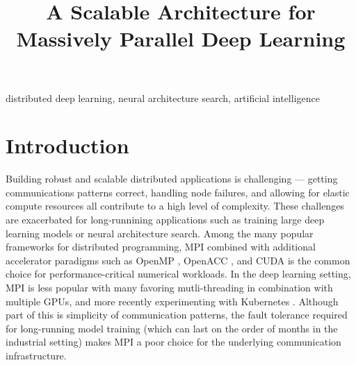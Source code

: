 \documentclass[conference]{IEEEtran}
\begin{document}
\title{A Scalable Architecture for Massively Parallel Deep Learning}

\author{
\and
{}
}

\maketitle

\begin{abstract}

\end{abstract}

\begin{IEEEkeywords}
distributed deep learning, neural architecture search, artificial intelligence
\end{IEEEkeywords}

\section{Introduction}
Building robust and scalable distributed applications is challenging --- getting
communications patterns correct, handling node failures, and allowing for elastic
compute resources all contribute to a high level of complexity. These challenges
are exacerbated for long-runnining applications such as training large deep learning
models or neural architecture search. Among the many popular frameworks for
distributed programming, MPI \cite{Forum:1994:MMI:898758} combined with
additional accelerator paradigms such as OpenMP \cite{Dagum:1998:OIA:615255.615542},
OpenACC \cite{Wienke:2012:OFE:2402420.2402522}, and CUDA \cite{Nickolls:2008:SPP:1365490.1365500}
is the common choice for performance-critical numerical workloads. In the deep
learning setting, MPI is less popular with many favoring mutli-threading in
combination with multiple GPUs, and more recently experimenting with Kubernetes
\cite{8094194, 8672301}. Although part of this is simplicity of communication patterns,
the fault tolerance required for long-running model training (which can last on the
order of months in the industrial setting) makes MPI a poor choice for the underlying
communication infrastructure.
\end{document}
